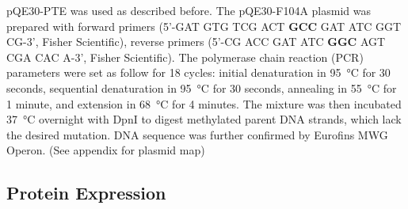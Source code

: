 \begin{refsection}
pQE30-PTE was used as described before\cite{Baker2011b}. The pQE30-F104A plasmid
was prepared with forward primers (5’-GAT GTG TCG ACT \textbf{GCC} GAT ATC GGT
CG-3’, Fisher Scientific), reverse primers (5’-CG ACC GAT ATC \textbf{GGC} AGT
CGA CAC A-3’, Fisher Scientific). The polymerase chain reaction (PCR)
parameters were set as follow for 18 cycles: initial denaturation in
\SI{95}{\celsius} for 30 seconds, sequential denaturation in \SI{95}{\celsius}
for 30 seconds, annealing in \SI{55}{\celsius} for 1 minute, and extension in
\SI{68}{\celsius} for 4 minutes. The mixture was then incubated
\SI{37}{\celsius} overnight with DpnI to digest methylated parent DNA strands,
which lack the desired mutation. DNA sequence was further confirmed by Eurofins
MWG Operon. (See appendix for plasmid map)

\subsection{Protein Expression}
\label{sec:protein-expression-method}


\end{refsection}

